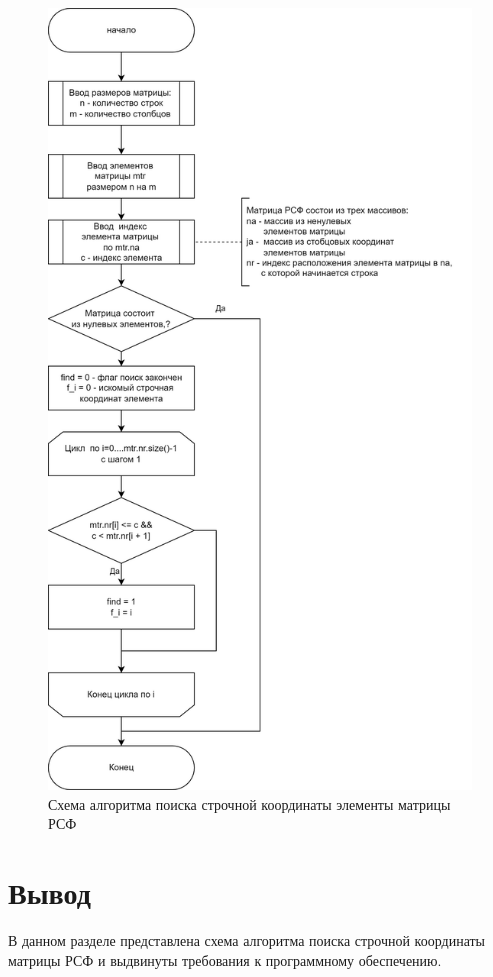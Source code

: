 \begin{figure}[h]
	\centering
	\includegraphics[height=0.85\textheight]{img/alg.png}
	\caption{Схема алгоритма поиска строчной координаты элементы матрицы РСФ}
	\label{fig:csr_diag}
\end{figure}

\clearpage

\section*{Вывод}
В данном разделе представлена схема алгоритма поиска строчной координаты матрицы РСФ и выдвинуты требования к программному обеспечению.